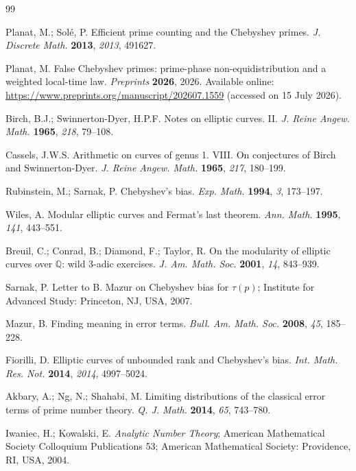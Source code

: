 \documentclass[11pt,reqno]{amsart}
\theoremstyle{remark}
\newcommand{\Q}{\mathbb{Q}}
\begin{document}
\begingroup
\small
\setlength{\parskip}{0pt}
\begin{thebibliography}{99}

Planat, M.; Sol\'e, P. Efficient prime counting and the Chebyshev primes. \emph{J. Discrete Math.} \textbf{2013}, \emph{2013}, 491627.

Planat, M. False Chebyshev primes: prime-phase non-equidistribution and a weighted local-time law. \emph{Preprints} \textbf{2026}, 2026. Available online: \url{https://www.preprints.org/manuscript/202607.1559} (accessed on 15 July 2026).

Birch, B.J.; Swinnerton-Dyer, H.P.F. Notes on elliptic curves. II. \emph{J. Reine Angew. Math.} \textbf{1965}, \emph{218}, 79--108.

Cassels, J.W.S. Arithmetic on curves of genus 1. VIII. On conjectures of Birch and Swinnerton-Dyer. \emph{J. Reine Angew. Math.} \textbf{1965}, \emph{217}, 180--199.

Rubinstein, M.; Sarnak, P. Chebyshev's bias. \emph{Exp. Math.} \textbf{1994}, \emph{3}, 173--197.

Wiles, A. Modular elliptic curves and Fermat's last theorem. \emph{Ann. Math.} \textbf{1995}, \emph{141}, 443--551.

Breuil, C.; Conrad, B.; Diamond, F.; Taylor, R. On the modularity of elliptic curves over $\Q$: wild 3-adic exercises. \emph{J. Am. Math. Soc.} \textbf{2001}, \emph{14}, 843--939.

Sarnak, P. Letter to B. Mazur on Chebyshev bias for $\tau(p)$; Institute for Advanced Study: Princeton, NJ, USA, 2007.

Mazur, B. Finding meaning in error terms. \emph{Bull. Am. Math. Soc.} \textbf{2008}, \emph{45}, 185--228.

Fiorilli, D. Elliptic curves of unbounded rank and Chebyshev's bias. \emph{Int. Math. Res. Not.} \textbf{2014}, \emph{2014}, 4997--5024.

Akbary, A.; Ng, N.; Shahabi, M. Limiting distributions of the classical error terms of prime number theory. \emph{Q. J. Math.} \textbf{2014}, \emph{65}, 743--780.

Iwaniec, H.; Kowalski, E. \emph{Analytic Number Theory}; American Mathematical Society Colloquium Publications 53; American Mathematical Society: Providence, RI, USA, 2004.


\end{thebibliography}
\end{document}
